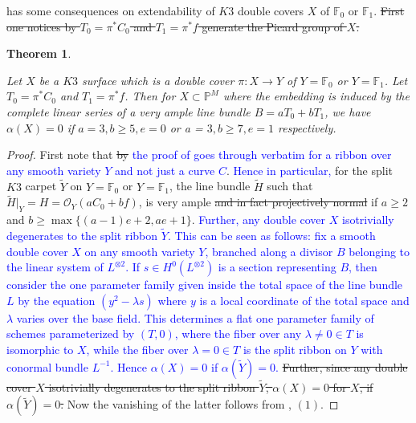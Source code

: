 \documentclass[11pt,twoside]{amsart}
\theoremstyle{plain}
\numberwithin{equation}{section}
\newtheorem{theorem}{Theorem}[section]
\theoremstyle{definition}
\begin{document}
 has some consequences on extendability of $K3$ double covers $X$ of $\mathbb{F}_0$ or $\mathbb{F}_1$. \sout{First one notices by $T_0 = \pi^*C_0$ and $T_1 = \pi^*f$ generate the Picard group of $X$.} 

\begin{theorem}\label{rank two}

Let $X$ be a $K3$ surface which is a double cover $\pi: X \to Y$ of $Y = \mathbb{F}_0$ or $Y = \mathbb{F}_1$. Let $T_0 = \pi^*C_0$ and $T_1 = \pi^*f$. Then for $X \subset \mathbb{P}^M$ where the embedding is induced by the complete linear series of a very ample line bundle $B = aT_0+bT_1$, we have $\alpha(X) = 0$ if $a = 3, b \geq 5, e = 0$ or a = $3, b \geq 7, e = 1$ respectively.

\end{theorem}

\begin{proof}
    First note that \sout{by} \textcolor{blue}{the proof of } \cite[Proposition $2.1$]{DM24} \textcolor{blue}{goes through verbatim for a ribbon over any smooth variety $Y$ and not just a curve $C$}. \textcolor{blue}{Hence in particular,} for the split $K3$ carpet $\widetilde{Y}$ on $Y = \mathbb{F}_0$ or $Y = \mathbb{F}_1$, the line bundle $\widetilde{H}$ such that $\widetilde{H}|_Y = H = \mathcal{O}_Y(aC_0+bf)$, is very ample \sout{and in fact projectively normal} if $a \geq 2$ and $b \geq \max\{(a-1)e+2, ae+1\}$. 
    \textcolor{blue}{Further, any double cover $X$ isotrivially degenerates to the split ribbon $\widetilde{Y}$. This can be seen as follows: fix a smooth double cover $X$ on any smooth variety $Y$, branched along a divisor $B$ belonging to the linear system of $L^{\otimes 2}$. If  $s \in H^0(L^{\otimes 2})$ is a section representing $B$, then consider the one parameter family given inside the total space of the line bundle $L$ by the equation  $(y^2-\lambda s)$ where $y$ is a local coordinate of the total space and $\lambda$ varies over the base field. This determines a flat one parameter family of schemes parameterized by $(T,0)$, where the fiber over any $\lambda \neq 0 \in T$ is isomorphic to $X$, while the fiber over $\lambda = 0 \in T$ is the split ribbon on $Y$ with conormal bundle $L^{-1}$. Hence $\alpha(X) = 0$ if $\alpha(\widetilde{Y}) = 0$. 
}
    \sout{Further, since any double cover $X$ isotrivially degenerates to the split ribbon $\widetilde{Y}$, $\alpha(X) = 0$ for $X$, if $\alpha(\widetilde{Y}) = 0$. }
    Now the vanishing of the latter follows from , $(1)$.
\end{proof}
\end{document}
